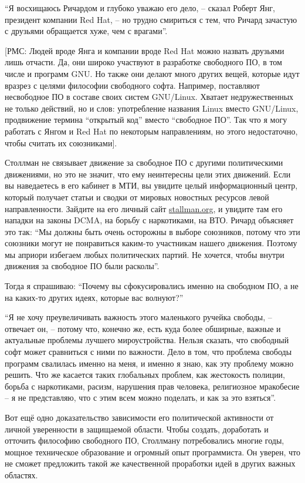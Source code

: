 \enquote{Я восхищаюсь Ричардом и глубоко уважаю его дело, -- сказал Роберт Янг, президент компании Red Hat, -- но трудно смириться с тем, что Ричард зачастую с друзьями обращается хуже, чем с врагами}.

[РМС: Людей вроде Янга и компании вроде Red Hat можно назвать друзьями лишь отчасти. Да, они широко участвуют в разработке свободного ПО, в том числе и программ GNU. Но также они делают много других вещей, которые идут вразрез с целями философии свободного софта. Например, поставляют несвободное ПО в составе своих систем GNU/Linux. Хватает недружественных не только действий, но и слов: употребление названия Linux вместо GNU/Linux, продвижение термина \enquote{открытый код} вместо \enquote{свободное ПО}. Так что я могу работать с Янгом и Red Hat по некоторым направлениям, но этого недостаточно, чтобы считать их союзниками].

Столлман не связывает движение за свободное ПО с другими политическими движениями, но это не значит, что ему неинтересны цели этих движений. Если вы наведаетесь в его кабинет в МТИ, вы увидите целый информационный центр, который получает статьи и сводки от мировых новостных ресурсов левой направленности. Зайдите на его личный сайт \url{stallman.org}, и увидите там его нападки на законы DCMA, на борьбу с наркотиками, на ВТО. Ричард объясняет это так: \enquote{Мы должны быть очень осторожны в выборе союзников, потому что эти союзники могут не понравиться каким-то участникам нашего движения. Поэтому мы априори избегаем любых политических партий. Не хочется, чтобы внутри движения за свободное ПО были расколы}.

Тогда я спрашиваю: \enquote{Почему вы сфокусировались именно на свободном ПО, а не на каких-то других идеях, которые вас волнуют?}

\enquote{Я не хочу преувеличивать важность этого маленького ручейка свободы, -- отвечает он, -- потому что, конечно же, есть куда более обширные, важные и актуальные проблемы лучшего мироустройства. Нельзя сказать, что свободный софт может сравниться с ними по важности. Дело в том, что проблема свободы программ свалилась именно на меня, и именно я знаю, как эту проблему можно решить. Что же касается таких глобальных проблем, как жестокость полиции, борьба с наркотиками, расизм, нарушения прав человека, религиозное мракобесие -- я не представляю, что с этим всем можно поделать, и как за это взяться}.

Вот ещё одно доказательство зависимости его политической активности от личной уверенности в защищаемой области. Чтобы создать, доработать и отточить философию свободного ПО, Столлману потребовались многие годы, мощное техническое образование и огромный опыт программиста. Он уверен, что не сможет предложить такой же качественной проработки идей в других важных областях.

